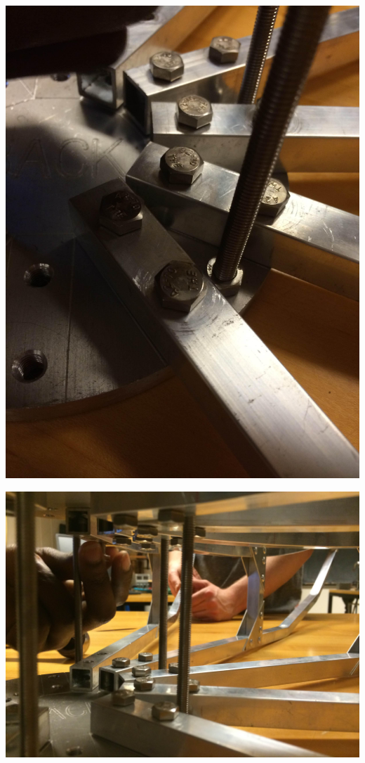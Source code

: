 \documentclass[11pt]{article} %
\begin{document}
\begin{center}
\includegraphics[scale=0.12]{dish/02.jpeg}
\end{center}

\begin{center}
\includegraphics[scale=0.12]{dish/03.jpeg}
\end{center}
\end{document}
